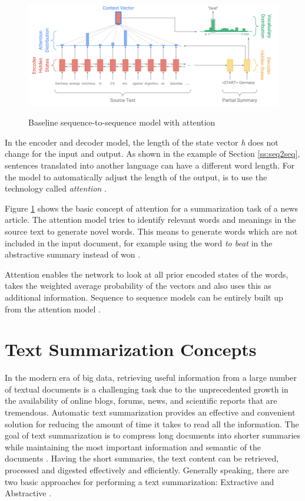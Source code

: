 \begin{figure}
	\begin{center}
		\includegraphics[width=6.5in]{photos/attenion}\\
		\caption{Baseline sequence-to-sequence model with attention \cite{see-etal-2017-get} }\label{attention1}
	\end{center}
\end{figure}

In the encoder and decoder model, the length of the state vector \textit{h} does not change for the input and output. As shown in the example of Section \ref{ss:seq2seq}, sentences translated into another language can have a different word length. For the model to automatically adjust the length of the output, is to use the technology called \textit{attention} \cite{attention} \cite{attention2}.

Figure \ref{attention1} shows the basic concept of attention for a summarization task of a news article.  The attention model tries to identify relevant words and meanings in the source text to generate novel words. This means to generate words which are not included in the input document, for example using the word \textit{to beat} in the abstractive summary instead of won \cite{see-etal-2017-get}.

Attention enables the network to look at all prior encoded states of the words, takes the weighted average probability of the vectors and also uses this as additional information. Sequence to sequence models can be entirely built up from the attention model \cite{attention2}. 

\section{Text Summarization Concepts}

In the modern era of big data, retrieving useful information from a large number of textual documents is a challenging task due to the unprecedented growth in the availability of online blogs, forums, news, and scientific reports that are tremendous. Automatic text summarization provides an effective and convenient solution for reducing the amount of time it takes to read all the information. The goal of text summarization is to compress long documents into shorter summaries while maintaining the most important information and semantic of the documents \cite{ts-intro} \cite{ts-intro2}. Having the short summaries, the text content can be retrieved, processed and digested effectively and efficiently. 
Generally speaking, there are two basic approaches for performing a text summarization: Extractive and Abstractive \cite{ts-intro3}. 

